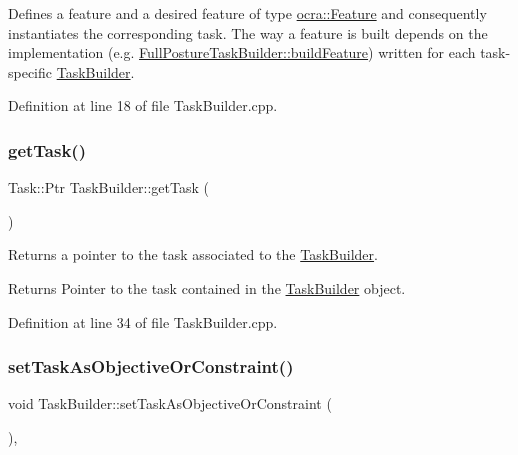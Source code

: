 Defines a feature and a desired feature of type \hyperlink{classocra_1_1Feature}{ocra\+::\+Feature} and consequently instantiates the corresponding task. The way a feature is built depends on the implementation (e.\+g. \hyperlink{classocra_1_1FullPostureTaskBuilder_a7651ca4fd2ef7c8096a399b128981122}{Full\+Posture\+Task\+Builder\+::build\+Feature}) written for each task-\/specific \hyperlink{classocra_1_1TaskBuilder}{Task\+Builder}. 

Definition at line 18 of file Task\+Builder.\+cpp.

\hypertarget{classocra_1_1TaskBuilder_a31a863f23c736bcfa9f1f4c5e24d4859}{}\label{classocra_1_1TaskBuilder_a31a863f23c736bcfa9f1f4c5e24d4859} 
\subsubsection{\texorpdfstring{get\+Task()}{getTask()}}
{\footnotesize\ttfamily Task\+::\+Ptr Task\+Builder\+::get\+Task (\begin{DoxyParamCaption}{ }\end{DoxyParamCaption})}

Returns a pointer to the task associated to the \hyperlink{classocra_1_1TaskBuilder}{Task\+Builder}.

\begin{DoxyReturn}{Returns}
Pointer to the task contained in the \hyperlink{classocra_1_1TaskBuilder}{Task\+Builder} object. 
\end{DoxyReturn}


Definition at line 34 of file Task\+Builder.\+cpp.

\hypertarget{classocra_1_1TaskBuilder_a9e7588983e3adf7f706d122a75e84d05}{}\label{classocra_1_1TaskBuilder_a9e7588983e3adf7f706d122a75e84d05} 
\subsubsection{\texorpdfstring{set\+Task\+As\+Objective\+Or\+Constraint()}{setTaskAsObjectiveOrConstraint()}}
{\footnotesize\ttfamily void Task\+Builder\+::set\+Task\+As\+Objective\+Or\+Constraint (\begin{DoxyParamCaption}{ }\end{DoxyParamCaption})\hspace{0.3cm}{\ttfamily [protected]}, {\ttfamily [virtual]}}

